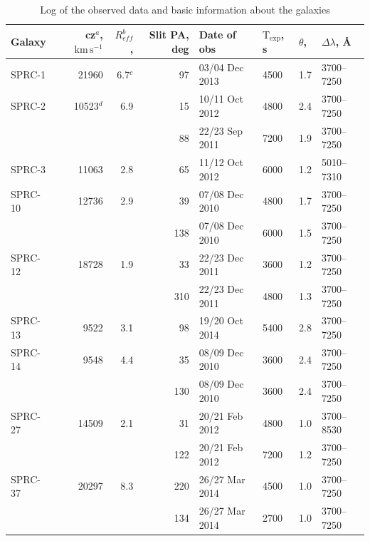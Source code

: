 \documentclass[useAMS,usenatbib]{mnras}
\newcommand{\kms}{\,\mbox{km}\,\mbox{s}^{-1}}
\begin{document}
\begin{table}
  \caption{Log of the observed data and basic information about the galaxies}
	\label{tab:data_info}
  \begin{threeparttable}
	\begin{small}
		\begin{tabular}{lrrrllll}
			\hline
			Galaxy  &  cz$^a$, $\kms$ & $R_{eff}^b$, \arcsec & Slit PA, deg  & Date of obs & $\mathrm{T_{exp}}$, s & $\theta$, \arcsec &  $\Delta\lambda$, \AA  \\
			\hline
			SPRC-1   & 21960  & 6.7$^c$ & 97  & 03/04 Dec 2013 & 4500 & 1.7 & 3700--7250 \\
			{SPRC-2}&		10523$^d$ & 	6.9 & 15  & 10/11 Oct 2012 & 4800 & 2.4 & 3700--7250 \\
			& & & 88 & 22/23 Sep 2011 & 7200 & 1.9 &3700--7250 \\
			SPRC-3 &  11063 &   2.8 & 65   & 11/12 Oct 2012 & 6000 & 1.2 & 5010--7310  \\
			{SPRC-10} & 12736  & 2.9 & 39  & 07/08 Dec 2010 & 4800  & 1.7 & 3700--7250  \\
			& & & 138 & 07/08 Dec 2010 & 6000 & 1.5 &3700--7250 \\
			{SPRC-12} &	18728 &  1.9 &  33 & 22/23 Dec 2011 & 3600 & 1.2 & 3700--7250  \\
			& 						&  											 &  310 & 22/23 Dec 2011  & 4800 & 1.3 & 3700--7250 \\
			SPRC-13 &9522 &   3.1 &  98 & 19/20 Oct 2014 & 5400  & 2.8 & 3700--7250  \\
			SPRC-14 & 9548  &   4.4 &  35 & 08/09 Dec 2010 & 3600 & 2.4 & 3700--7250  \\
            &   &  &  130 & 08/09 Dec 2010 & 3600 & 2.4 & 3700--7250  \\
			{SPRC-27} & 14509   &   2.1 &  31 & 20/21 Feb 2012 & 4800 & 1.0 & 3700--8530   \\
			& 		 								&       					 &  122 & 20/21 Feb 2012 & 7200 & 1.2 & 3700--7250  \\
			{SPRC-37} & 20297  &   8.3 &   220& 26/27 Mar 2014& 4500  & 1.0& 3700--7250 \\
			& & & 134 & 26/27 Mar 2014& 2700  & 1.0& 3700--7250 \\

\end{tabular}
\end{small}
\end{threeparttable}
\end{table}
\end{document}
